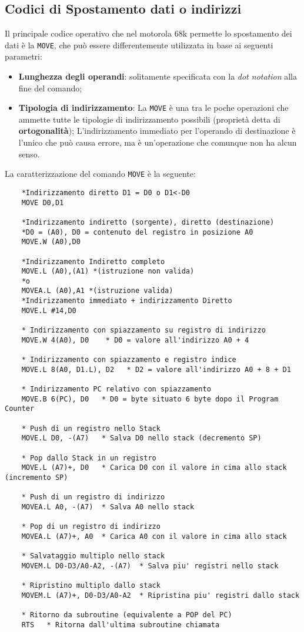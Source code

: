 \subsection{Codici di Spostamento dati o indirizzi}
Il principale codice operativo che nel motorola 68k permette lo spostamento dei dati è la \lstinline|MOVE|, che può essere differentemente utilizzata in base ai seguenti parametri:

\begin{itemize}
    \item \textbf{Lunghezza degli operandi}: solitamente specificata con la \textit{dot notation} alla fine del comando;
    \item \textbf{Tipologia di indirizzamento}: La \lstinline|MOVE| è una tra le poche operazioni che ammette tutte le tipologie di indirizzamento possibili (proprietà detta di \textbf{ortogonalità}); L'indirizzamento immediato per l'operando di destinazione è l'unico che può causa errore, ma è un'operazione che comunque non ha alcun senso.
\end{itemize}

La caratterizzazione del comando \lstinline|MOVE| è la seguente:
\begin{lstlisting}
    *Indirizzamento diretto D1 = D0 o D1<-D0
    MOVE D0,D1

    *Indirizzamento indiretto (sorgente), diretto (destinazione)
    *D0 = (A0), D0 = contenuto del registro in posizione A0
    MOVE.W (A0),D0

    *Indirizzamento Indiretto completo
    MOVE.L (A0),(A1) *(istruzione non valida)
    *o
    MOVEA.L (A0),A1 *(istruzione valida)
    *Indirizzamento immediato + indirizzamento Diretto
    MOVE.L #14,D0

    * Indirizzamento con spiazzamento su registro di indirizzo
    MOVE.W 4(A0), D0    * D0 = valore all'indirizzo A0 + 4

    * Indirizzamento con spiazzamento e registro indice
    MOVE.L 8(A0, D1.L), D2   * D2 = valore all'indirizzo A0 + 8 + D1

    * Indirizzamento PC relativo con spiazzamento
    MOVE.B 6(PC), D0   * D0 = byte situato 6 byte dopo il Program Counter

    * Push di un registro nello Stack
    MOVE.L D0, -(A7)   * Salva D0 nello stack (decremento SP)

    * Pop dallo Stack in un registro
    MOVE.L (A7)+, D0   * Carica D0 con il valore in cima allo stack (incremento SP)

    * Push di un registro di indirizzo
    MOVEA.L A0, -(A7)  * Salva A0 nello stack

    * Pop di un registro di indirizzo
    MOVEA.L (A7)+, A0  * Carica A0 con il valore in cima allo stack

    * Salvataggio multiplo nello stack
    MOVEM.L D0-D3/A0-A2, -(A7)  * Salva piu' registri nello stack

    * Ripristino multiplo dallo stack
    MOVEM.L (A7)+, D0-D3/A0-A2  * Ripristina piu' registri dallo stack

    * Ritorno da subroutine (equivalente a POP del PC)
    RTS   * Ritorna dall'ultima subroutine chiamata
\end{lstlisting}

